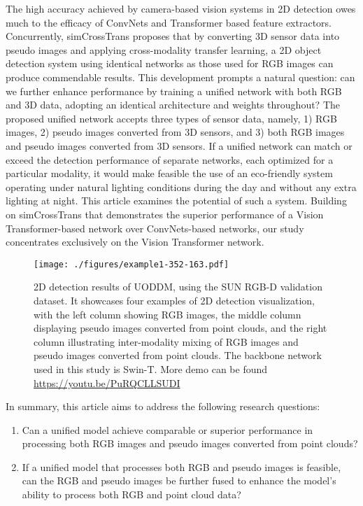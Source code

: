 \documentclass[]{modified_llncs}
\begin{document}
The high accuracy achieved by camera-based vision systems in 2D detection owes much to the efficacy of ConvNets\cite{10.1162/neco.1989.1.4.541} and Transformer\cite{transformer_cite} based feature extractors. Concurrently, simCrossTrans\cite{simCrossTrans_cite} proposes that by converting 3D sensor data into pseudo images and applying cross-modality transfer learning, a 2D object detection system using identical networks as those used for RGB images can produce commendable results. This development prompts a natural question: can we further enhance performance by training a unified network with both RGB and 3D data, adopting an identical architecture and weights throughout? The proposed unified network accepts three types of sensor data, namely, 1) RGB images, 2) pseudo images converted from 3D sensors, and 3) both RGB images and pseudo images converted from 3D sensors. If a unified network can match or exceed the detection performance of separate networks, each optimized for a particular modality, it would make feasible the use of an eco-friendly system operating under natural lighting conditions during the day and without any extra lighting at night. This article examines the potential of such a system. Building on simCrossTrans\cite{simCrossTrans_cite} that demonstrates the superior performance of a Vision Transformer-based network over ConvNets-based networks, our study concentrates exclusively on the Vision Transformer network.\\

\begin{figure}[H]
\begin{center}
\texttt{[image: ./figures/example1-352-163.pdf]}
\end{center}
    \caption{2D detection results of UODDM, using the SUN RGB-D validation dataset. It showcases four examples of 2D detection visualization, with the left column showing RGB images, the middle column displaying pseudo images converted from point clouds, and the right column illustrating inter-modality mixing of RGB images and pseudo images converted from point clouds. The backbone network used in this study is Swin-T. More demo can be found \url{https://youtu.be/PuRQCLLSUDI}}
\label{fig:example}
\end{figure}
In summary, this article aims to address the following research questions:\\
\begin{enumerate}
\item Can a unified model achieve comparable or superior performance in processing both RGB images and pseudo images converted from point clouds?
    \item If a unified model that processes both RGB and pseudo images is feasible, can the RGB and pseudo images be further fused to enhance the model's ability to process both RGB and point cloud data?
\end{enumerate}
\end{document}
